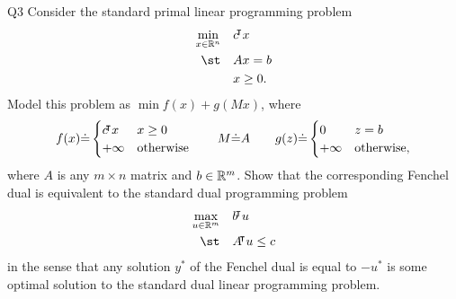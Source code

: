 \documentclass{article}
\begin{document}
\begin{problem}
    {Q3}
    Consider the standard primal linear programming problem
    \begin{align*}
        \min_{x\in\R^n}\quad & c\trn x \\
        \st\quad & Ax=b \\
        & x\geq 0.
    \end{align*}
    Model this problem as $\min f(x)+g(Mx)$, where
    \[
    f(x)\dot{=}
    \begin{cases}
        c{}^{\mkern-4mu\intercal} x & x\geq 0\\
        +\infty & \text{otherwise}
    \end{cases}
    \qquad
    M\dot{=}A
    \qquad
    g(z)\dot{=}
    \begin{cases}
        0 & z=b\\
        +\infty & \text{otherwise},
    \end{cases}
    \]
    where $A$ is any $m\times n$ matrix and $b\in\mathbb{R}^m$. Show that the corresponding Fenchel dual is equivalent to the standard dual programming problem
    \begin{align*}
        \max_{u\in\R^m}\quad & b\trn u \\
        \st\quad & A\trn u\leq c \\
    \end{align*}
    in the sense that any solution $y^*$ of the Fenchel dual is equal to $-u^*$ is some optimal solution to the standard dual linear programming problem.
\end{problem}
\end{document}
